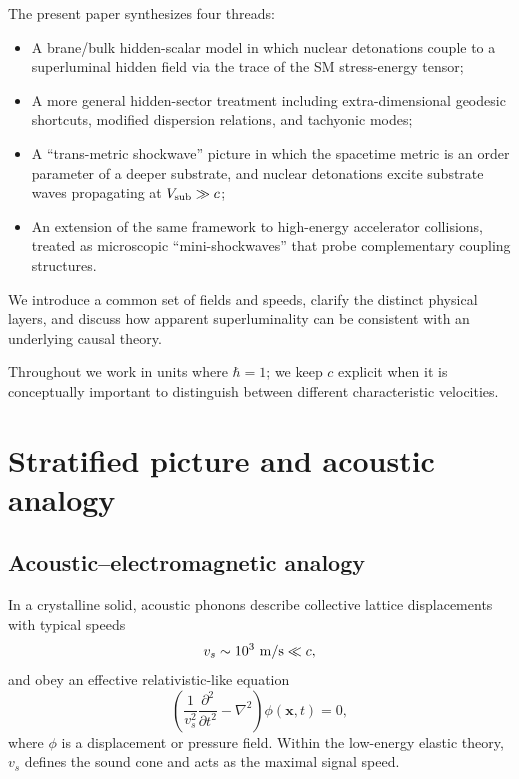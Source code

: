 \documentclass[aps,prd,twocolumn,nofootinbib,superscriptaddress]{revtex4-2}
\begin{document}
The present paper synthesizes four threads:
\begin{itemize}
    \item A brane/bulk hidden-scalar model in which nuclear detonations couple to a superluminal hidden field via the trace of the SM stress-energy tensor;
    \item A more general hidden-sector treatment including extra-dimensional geodesic shortcuts, modified dispersion relations, and tachyonic modes;
    \item A ``trans-metric shockwave'' picture in which the spacetime metric is an order parameter of a deeper substrate, and nuclear detonations excite substrate waves propagating at $V_{\rm sub} \gg c$;
    \item An extension of the same framework to high-energy accelerator collisions, treated as microscopic ``mini-shockwaves'' that probe complementary coupling structures.
\end{itemize}
We introduce a common set of fields and speeds, clarify the distinct physical layers, and discuss how apparent superluminality can be consistent with an underlying causal theory.

Throughout we work in units where $\hbar = 1$; we keep $c$ explicit when it is conceptually important to distinguish between different characteristic velocities.

\section{Stratified picture and acoustic analogy}
\label{sec:layers}

\subsection{Acoustic--electromagnetic analogy}

In a crystalline solid, acoustic phonons describe collective lattice displacements with typical speeds
\begin{equation}
    v_s \sim 10^3~{\rm m/s} \ll c,
\end{equation}
and obey an effective relativistic-like equation
\begin{equation}
    \left(\frac{1}{v_s^2}\frac{\partial^2}{\partial t^2} - \nabla^2\right)\phi(\mathbf{x},t) = 0,
    \label{eq:acoustic_wave}
\end{equation}
where $\phi$ is a displacement or pressure field. Within the low-energy elastic theory, $v_s$ defines the sound cone and acts as the maximal signal speed.
\end{document}
